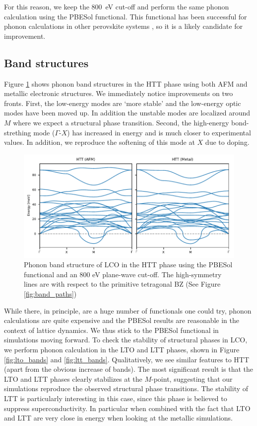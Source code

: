 For this reason, we keep the \SI{800}{\eV} cut-off and perform the same phonon calculation using the PBESol \cite{Csonka2009} functional. This functional has been successful for phonon calculations in other perovskite systems \cite{DaSilva2015}, so it is a likely candidate for improvement. 

\subsection{Band structures}
Figure \ref{fig:htt_bands} shows phonon band structures in the HTT phase using both AFM and metallic electronic structures. We immediately notice improvements on two fronts. First, the low-energy modes are `more stable' and the low-energy optic modes have been moved up. In addition the unstable modes are localized around $M$ where we expect a structural phase transition. Second, the high-energy bond-strething mode ($\Gamma$-$X$) has increased in energy and is much closer to experimental values. In addition, we reproduce the softening of this mode at $X$ due to doping.

\begin{figure}
	\centering
	\includegraphics[width=\textwidth]{fig/simulation/htt_bands.pdf}
	\caption[HTT Bands]{Phonon band structure of LCO in the HTT phase using the PBESol functional and an 800 eV plane-wave cut-off. The high-symmetry lines are with respect to the primitive tetragonal BZ (See Figure \ref{fig:band_paths})}
	\label{fig:htt_bands}
\end{figure}

While there, in principle, are a huge number of functionals one could try, phonon calculations are quite expensive and the PBESol results are reasonable in the context of lattice dynamics. We thus stick to the PBESol functional in simulations moving forward. To check the stability of structural phases in LCO, we perform phonon calculation in the LTO and LTT phases, shown in Figure \ref{fig:lto_bands} and \ref{fig:ltt_bands}. Qualitatively, we see similar features to HTT (apart from the obvious increase of bands). The most significant result is that the LTO and LTT phases clearly stabilizes at the $M$-point, suggesting that our simulations reproduce the observed structural phase transitions. The stability of LTT is particularly interesting in this case, since this phase is believed to suppress superconductivity. In particular when combined with the fact that LTO and LTT are very close in energy when looking at the metallic simulations.

